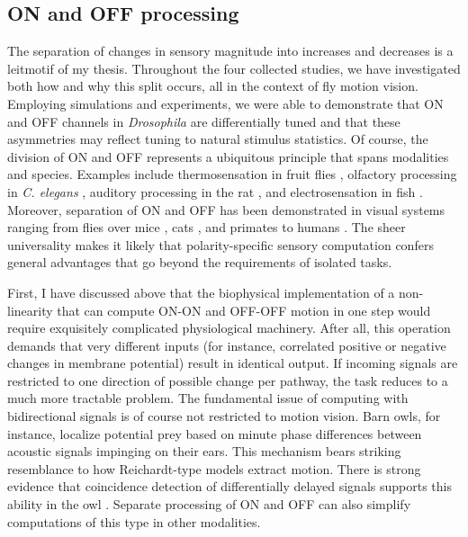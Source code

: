 \subsection{ON and OFF processing}
The separation of changes in sensory magnitude into increases and decreases is a leitmotif of my thesis. Throughout the four collected studies, we have investigated both how and why this split occurs, all in the context of fly motion vision. Employing simulations and experiments, we were able to demonstrate that ON and OFF channels in \textit{Drosophila} are differentially tuned and that these asymmetries may reflect tuning to natural stimulus statistics. Of course, the division of ON and OFF represents a ubiquitous principle that spans modalities and species. Examples include thermosensation in fruit flies \citep{Gallio:2011aa}, olfactory processing in \textit{C. elegans} \citep{Chalasani:2007aa}, auditory processing in the rat \citep{Scholl:2010aa}, and electrosensation in fish \citep{Clarke:2015aa}. Moreover, separation of ON and OFF has been demonstrated in visual systems ranging from flies \citep{Joesch:2010fw} over mice \citep{Euler:2014aa}, cats \citep{Wassle:2004aa}, and primates \citep{Field:2007aa} to humans \citep{Hashimoto:2013aa}. The sheer universality makes it likely that polarity-specific sensory computation confers general advantages that go beyond the requirements of isolated tasks.

First, I have discussed above that the biophysical implementation of a non-linearity that can compute ON-ON and OFF-OFF motion in one step would require exquisitely complicated physiological machinery. After all, this operation demands that very different inputs (for instance, correlated positive or negative changes in membrane potential) result in identical output. If incoming signals are restricted to one direction of possible change per pathway, the task reduces to a much more tractable problem. The fundamental issue of computing with bidirectional signals is of course not restricted to motion vision. Barn owls, for instance, localize potential prey based on minute phase differences between acoustic signals impinging on their ears. This mechanism bears striking resemblance to how Reichardt-type models extract motion. There is strong evidence that coincidence detection of differentially delayed signals supports this ability in the owl \citep{Jeffress:1948aa,Carr:1988aa}. Separate processing of ON and OFF can also simplify computations of this type in other modalities.

